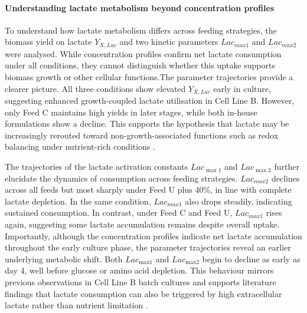 \paragraph{Understanding lactate metabolism beyond concentration profiles}

To understand how lactate metabolism differs across feeding strategies, the biomass yield on lactate $Y_{X,Lac}$ and two kinetic parameters $Lac_{max1}$ and $Lac_{max2}$ were analysed. While concentration profiles confirm net lactate consumption under all conditions, they cannot distinguish whether this uptake supports biomass growth or other cellular functions.The parameter trajectories provide a clearer picture. All three conditions show elevated $Y_{X,Lac}$ early in culture, suggesting enhanced growth-coupled lactate utilisation in Cell Line B. However, only Feed C maintains high yields in later stages, while both in-house formulations show a decline. This supports the hypothesis that lactate may be increasingly rerouted toward non-growth-associated functions such as redox balancing under nutrient-rich conditions \cite{Morrissey2025NicotinamideCulture}.

{\color{blue}The trajectories of the lactate activation constants $Lac_{\max1}$ and $Lac_{\max2}$ further elucidate the dynamics of consumption across feeding strategies.} $Lac_{max2}$ declines across all feeds but most sharply under Feed U plus 40\%, in line with complete lactate depletion. In the same condition, $Lac_{max1}$ also drops steadily, indicating sustained consumption. In contrast, under Feed C and Feed U, $Lac_{max1}$ rises again, suggesting some lactate accumulation remains despite overall uptake. {\color{blue}Importantly,} although the concentration profiles indicate net lactate accumulation throughout the early culture phase, the parameter trajectories {\color{blue}reveal an earlier} underlying metabolic shift. Both $Lac_{\text{max1}}$ and $Lac_{\text{max2}}$ begin to decline as early as day 4, well before glucose or amino acid depletion. This behaviour mirrors previous observations in Cell Line B batch cultures \cite{Kyriakopoulos2013ComparativeProductivity} and supports literature findings that lactate consumption can also be triggered by high extracellular lactate rather than nutrient limitation \cite{Zagari2013HighCulture, Mulukutla2012OnCells}.

